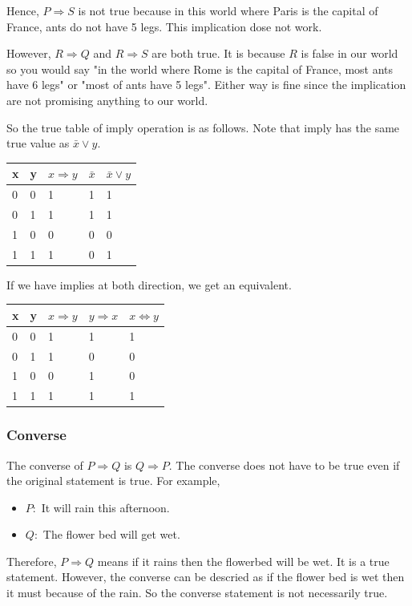 Hence, $P \Rightarrow S$ is not true because in this world where Paris is the capital of France, ants do not have 5 legs. This implication dose not work.

However, $R \Rightarrow Q$ and $R \Rightarrow S$ are both true. It is because $R$ is false in our world so you would say "in the world where Rome is the capital of France, most ants have 6 legs" or "most of ants have 5 legs". Either way is fine since the implication are not promising anything to our world.

So the true table of imply operation is as follows. Note that imply has the same true value as $\bar{x} \vee y$.

\begin{table}[H]
	\centering
	\begin{tabular}{|l|l|l|l|l|}
		\hline
		x & y & $x \Rightarrow y$ & $\bar{x}$ & $\bar{x} \vee y$ \\ \hline
		0 & 0 & 1                 & 1         & 1                \\ \hline
		0 & 1 & 1                 & 1         & 1                \\ \hline
		1 & 0 & 0                 & 0         & 0                \\ \hline
		1 & 1 & 1                 & 0         & 1                \\ \hline
	\end{tabular}
\end{table}

If we have implies at both direction, we get an equivalent.

\begin{table}[H]
	\centering
	\begin{tabular}{|l|l|l|l|l|}
		\hline
		x & y & $x \Rightarrow y$ & $y \Rightarrow x$ & $x \iff y$ \\ \hline
		0 & 0 & 1                 & 1                 & 1          \\ \hline
		0 & 1 & 1                 & 0                 & 0          \\ \hline
		1 & 0 & 0                 & 1                 & 0          \\ \hline
		1 & 1 & 1                 & 1                 & 1          \\ \hline
	\end{tabular}
\end{table}
\subsubsection{Converse}
The converse of $P \Rightarrow Q$ is $Q \Rightarrow P$. The converse does not have to be true even if the original statement is true. For example,
\begin{itemize}
	\item $P:$ It will rain this afternoon.
	\item $Q:$ The flower bed will get wet.
\end{itemize} 
Therefore, $P \Rightarrow Q$ means if it rains then the flowerbed will be wet. It is a true statement. However, the converse can be descried as if the flower bed is wet then it must because of the rain. So the converse statement is not necessarily true.



